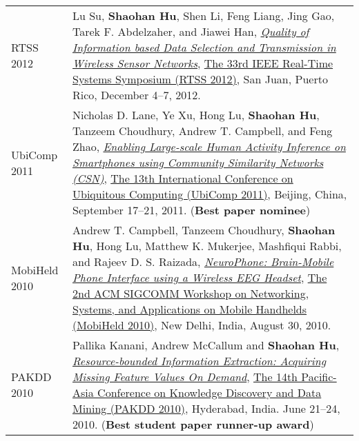 \begin{longtabu}{p{.51\sectionwidth} p{.78\resumewidth}}

{\sc RTSS 2012}\hypertarget{su2012rtss}{} &
Lu Su, \textbf{Shaohan Hu}, Shen Li, Feng Liang, Jing Gao, Tarek F. Abdelzaher, and Jiawei Han,
\href{http://ieeexplore.ieee.org/document/6424815}{\emph{Quality of Information based Data Selection and Transmission in Wireless Sensor Networks}},
\href{http://sites.ieee.org/rtss2012/}{\textsf{The 33rd IEEE Real-Time Systems Symposium (RTSS 2012)}},
San Juan, Puerto Rico, December 4--7, 2012. \\

{\sc UbiComp 2011}\hypertarget{lane2011ubicomp}{} &
Nicholas D. Lane, Ye Xu, Hong Lu, \textbf{Shaohan Hu}, Tanzeem Choudhury, Andrew T. Campbell, and Feng Zhao,
\href{http://portal.acm.org/citation.cfm?id=2030160}{\emph{Enabling Large-scale Human Activity Inference on Smartphones using Community Similarity Networks (CSN)}},
\href{http://www.ubicomp.org/ubicomp2011/}{\textsf{The 13th International Conference on Ubiquitous Computing (UbiComp 2011)}},
Beijing, China, September 17--21, 2011. (\textbf{Best paper nominee}) \\

{\sc MobiHeld 2010}\hypertarget{campbell2010mobiheld}{} &
Andrew T. Campbell, Tanzeem Choudhury, \textbf{Shaohan Hu}, Hong Lu, Matthew K. Mukerjee, Mashfiqui Rabbi, and Rajeev D. S. Raizada,
\href{http://portal.acm.org/citation.cfm?id=1851326}{\emph{NeuroPhone: Brain-Mobile Phone Interface using a Wireless EEG Headset}},
\href{http://conferences.sigcomm.org/sigcomm/2010/mhcfp.php}{\textsf{The 2nd ACM SIGCOMM Workshop on Networking, Systems, and Applications on Mobile Handhelds (MobiHeld 2010)}},
New Delhi, India, August 30, 2010. \\

{\sc PAKDD 2010}\hypertarget{kanani2010pakdd}{} &
Pallika Kanani, Andrew McCallum and \textbf{Shaohan Hu},
\href{http://www.springerlink.com/content/j41w758434321108}{\emph{Resource-bounded Information Extraction: Acquiring Missing Feature Values On Demand}},
\href{http://www.iiit.ac.in/conferences/pakdd2010}{\textsf{The 14th Pacific-Asia Conference on Knowledge Discovery and Data Mining (PAKDD 2010)}},
Hyderabad, India. June 21--24, 2010. (\textbf{Best student paper runner-up award}) \\

\end{longtabu}
